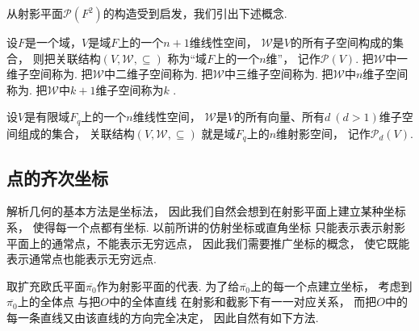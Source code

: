 \begin{example}
\begin{figure}[hbt]
	\caption{}
	\label{figure:射影平面.有限射影平面}
\end{figure}
\end{example}

从射影平面\(\mathcal{P}(F^2)\)的构造受到启发，我们引出下述概念.
\begin{definition}
设\(F\)是一个域，\(V\)是域\(F\)上的一个\(n+1\)维线性空间，
\(\mathscr{W}\)是\(V\)的所有子空间构成的集合，
则把关联结构\((V,\mathscr{W},\subseteq)\)
称为“域\(F\)上的一个\(n\)维”，
记作\(\mathcal{P}(V)\).
把\(\mathscr{W}\)中一维子空间称为.
把\(\mathscr{W}\)中二维子空间称为.
把\(\mathscr{W}\)中三维子空间称为.
把\(\mathscr{W}\)中\(n\)维子空间称为.
把\(\mathscr{W}\)中\(k+1\)维子空间称为\(k\) .
\end{definition}

设\(V\)是有限域\(F_q\)上的一个\(n\)维线性空间，
\(\mathscr{W}\)是\(V\)的所有向量、所有\(d\ (d>1)\)维子空间组成的集合，
关联结构\((V,\mathscr{W},\subseteq)\)
就是域\(F_q\)上的\(n\)维射影空间，
记作\(\mathcal{P}_d(V)\).

\subsection{点的齐次坐标}
解析几何的基本方法是坐标法，
因此我们自然会想到在射影平面上建立某种坐标系，
使得每一个点都有坐标.
以前所讲的仿射坐标或直角坐标
只能表示表示射影平面上的通常点，不能表示无穷远点，
因此我们需要推广坐标的概念，
使它既能表示通常点也能表示无穷远点.

取扩充欧氏平面\(\overline{\pi_0}\)作为射影平面的代表.
为了给\(\overline{\pi_0}\)上的每一个点建立坐标，
考虑到\(\overline{\pi_0}\)上的全体点
与把\(O\)中的全体直线
在射影和截影下有一一对应关系，
而把\(O\)中的每一条直线又由该直线的方向完全决定，
因此自然有如下方法.

